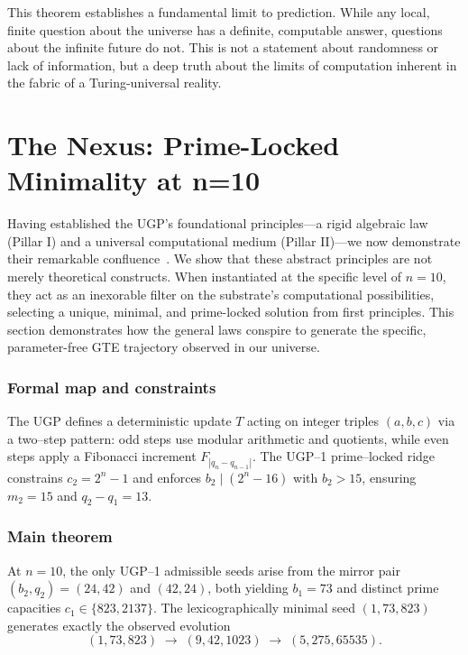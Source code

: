 \documentclass[12pt]{article}
\numberwithin{equation}{section}
\begin{document}
This theorem establishes a fundamental limit to prediction. While any local, finite question about the universe has a definite, computable answer, questions about the infinite future do not. This is not a statement about randomness or lack of information, but a deep truth about the limits of computation inherent in the fabric of a Turing-universal reality.

\section{The Nexus: Prime-Locked Minimality at n=10}\label{sec:nexus}

Having established the UGP's foundational principles---a rigid algebraic law (Pillar I) and a universal computational medium (Pillar II)---we now demonstrate their remarkable confluence~\cite{SpivackUGPFormalization,ugp-lean}. We show that these abstract principles are not merely theoretical constructs. When instantiated at the specific level of $n=10$, they act as an inexorable filter on the substrate's computational possibilities, selecting a unique, minimal, and prime-locked solution from first principles. This section demonstrates how the general laws conspire to generate the specific, parameter-free GTE trajectory observed in our universe.


\subsubsection*{Formal map and constraints} 
The UGP defines a deterministic update $T$ acting on integer triples $(a,b,c)$ via a two–step pattern: odd steps use modular arithmetic and quotients, while even steps apply a Fibonacci increment $F_{|q_n-q_{n-1}|}$. The UGP–1 prime–locked ridge constrains $c_2=2^n-1$ and enforces $b_2 \mid (2^n-16)$ with $b_2>15$, ensuring $m_2=15$ and $q_2-q_1=13$.

\subsubsection*{Main theorem} 
At $n=10$, the only UGP–1 admissible seeds arise from the mirror pair $(b_2,q_2)=(24,42)$ and $(42,24)$, both yielding $b_1=73$ and distinct prime capacities $c_1\in\{823,2137\}$. The lexicographically minimal seed $(1,73,823)$ generates exactly the observed evolution 
\[
(1,73,823)\;\to\;(9,42,1023)\;\to\;(5,275,65535).
\]
\end{document}
